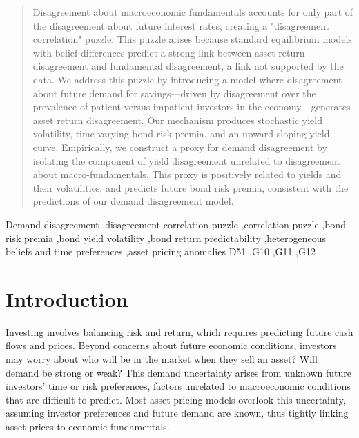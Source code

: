 \documentclass[preprint,11pt,authoryear]{elsarticle}
\theoremstyle{plain}
\begin{document}
\begin{frontmatter}
\begin{abstract}
Disagreement about macroeconomic fundamentals accounts for only part of the disagreement about future interest rates, creating a "disagreement correlation" puzzle. This puzzle arises because standard equilibrium models with belief differences predict a strong link between asset return disagreement and fundamental disagreement, a link not supported by the data. We address this puzzle by introducing a model where disagreement about future demand for savings—driven by disagreement over the prevalence of patient versus impatient investors in the economy—generates asset return disagreement. Our mechanism produces stochastic yield volatility, time-varying bond risk premia, and an upward-sloping yield curve. Empirically, we construct a proxy for demand disagreement by isolating the component of yield disagreement unrelated to disagreement about macro-fundamentals. This proxy is positively related to yields and their volatilities, and predicts future bond risk premia, consistent with the predictions of our demand disagreement model.
\end{abstract}

\begin{keyword}
Demand disagreement \sep disagreement correlation puzzle \sep correlation puzzle \sep bond risk premia \sep bond yield volatility \sep bond return predictability \sep heterogeneous beliefs and time preferences \sep asset pricing anomalies
\JEL D51 \sep G10 \sep G11 \sep G12
\end{keyword}

\end{frontmatter}

\section{Introduction}


Investing involves balancing risk and return, which requires predicting future cash flows and prices. Beyond concerns about future economic conditions, investors may worry about who will be in the market when they sell an asset? Will demand be strong or weak? This demand uncertainty arises from unknown future investors' time or risk preferences, factors unrelated to macroeconomic conditions that are difficult to predict. Most asset pricing models overlook this uncertainty, assuming investor preferences and future demand are known, thus tightly linking asset prices to economic fundamentals.  
\end{document}
